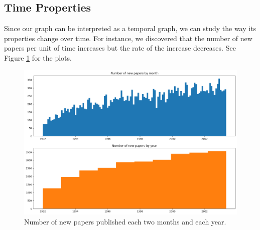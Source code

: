 \documentclass{article}
\newcommand\tab[1][1cm]{\hspace*{#1}}
\begin{document}
\subsection{Time Properties}
\tab Since our graph can be interpreted as a temporal graph, we can study the way its properties change over time. For instance, we discovered that the number of new papers per unit of time increases but the rate of the increase decreases. See Figure \ref{plot:number_of_new_papers} for the plots.
\begin{figure}[h]
\centering
\includegraphics[width=0.9\linewidth]{new_papers_over_time.png}
\caption{Number of new papers published each two months and each year.}
\label{plot:number_of_new_papers}
\end{figure}
\end{document}
